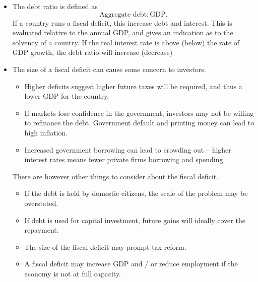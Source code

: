 \documentclass[../notes_compiled.tex]{subfiles}
\begin{document}
\begin{itemize}
\item The debt ratio is defined as
\begin{equation}
\text{Aggregate debt} : \text{GDP}.
\end{equation}
If a country runs a fiscal deficit, this increase debt and interest. This is evaluated relative to the annual GDP, and gives an indication as to the solvency of a country. If the real interest rate is above (below) the rate of GDP growth, the debt ratio will increase (decrease)
\item The size of a fiscal deficit can cause some concern to investors.
\begin{itemize}
\item Higher deficits suggest higher future taxes will be required, and thus a lower GDP for the country.
\item If markets lose confidence in the government, investors may not be willing to refinance the debt. Government default and printing money can lead to high inflation.
\item Increased government borrowing can lead to crowding out -- higher interest rates means fewer private firms borrowing and spending.
\end{itemize}
There are however other things to consider about the fiscal deficit.
\begin{itemize}
\item If the debt is held by domestic citizens, the scale of the problem may be overstated.
\item If debt is used for capital investment, future gains will ideally cover the repayment.
\item The size of the fiscal deficit may prompt tax reform.
\item A fiscal deficit may increase GDP and / or reduce employment if the economy is not at full capacity. 
\end{itemize}
\end{itemize}
\end{document}
